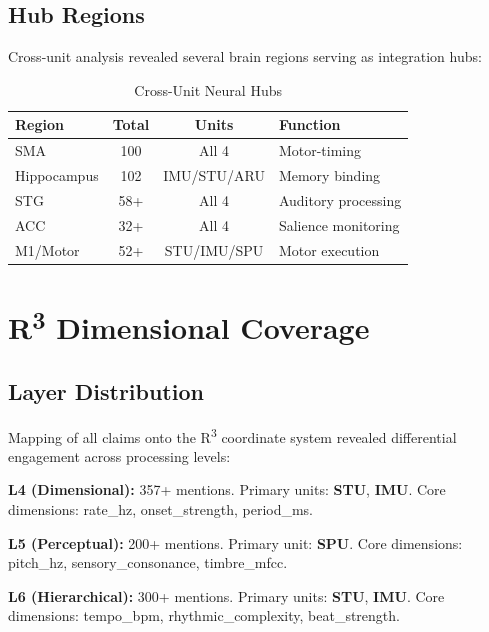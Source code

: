 \documentclass[9pt,onecolumn]{article}
\newcommand{\STU}{\textcolor{stucolor}{\textbf{STU}}}
\newcommand{\IMU}{\textcolor{imucolor}{\textbf{IMU}}}
\newcommand{\SPU}{\textcolor{spucolor}{\textbf{SPU}}}
\newcommand{\Rthree}{R\textsuperscript{3}}
\begin{document}
\subsection{Hub Regions}

Cross-unit analysis revealed several brain regions serving as integration hubs:

\begin{table}[H]
\centering
\caption{Cross-Unit Neural Hubs}
\label{tab:hubs}
\small
\begin{tabular}{@{}lccl@{}}
\toprule
\textbf{Region} & \textbf{Total} & \textbf{Units} & \textbf{Function} \\
\midrule
SMA & 100 & All 4 & Motor-timing \\
Hippocampus & 102 & IMU/STU/ARU & Memory binding \\
STG & 58+ & All 4 & Auditory processing \\
ACC & 32+ & All 4 & Salience monitoring \\
M1/Motor & 52+ & STU/IMU/SPU & Motor execution \\
\bottomrule
\end{tabular}
\end{table}


\section{\Rthree{} Dimensional Coverage}

\subsection{Layer Distribution}

Mapping of all claims onto the \Rthree{} coordinate system revealed differential engagement across processing levels:

\textbf{L4 (Dimensional):} 357+ mentions. Primary units: \STU{}, \IMU{}. Core dimensions: rate\_hz, onset\_strength, period\_ms.

\textbf{L5 (Perceptual):} 200+ mentions. Primary unit: \SPU{}. Core dimensions: pitch\_hz, sensory\_consonance, timbre\_mfcc.

\textbf{L6 (Hierarchical):} 300+ mentions. Primary units: \STU{}, \IMU{}. Core dimensions: tempo\_bpm, rhythmic\_complexity, beat\_strength.
\end{document}
